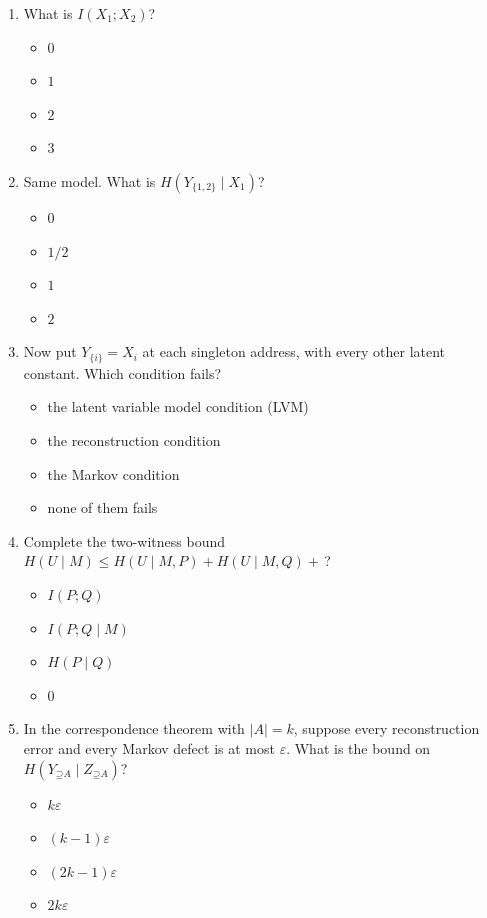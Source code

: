 \documentclass[11pt]{article}
\newcommand{\Up}{\mathord{\supseteq}}
\begin{document}
\begin{enumerate}
\item What is $I(X_1;X_2)$?
\begin{itemize}
\item $0$
\item $1$
\item $2$
\item $3$
\end{itemize}

\item Same model. What is $H(Y_{\{1,2\}}\mid X_1)$?
\begin{itemize}
\item $0$
\item $1/2$
\item $1$
\item $2$
\end{itemize}

\item Now put $Y_{\{i\}}=X_i$ at each singleton address, with every other latent
constant. Which condition fails?
\begin{itemize}
\item the latent variable model condition (LVM)
\item the reconstruction condition
\item the Markov condition
\item none of them fails
\end{itemize}

\item Complete the two-witness bound
$H(U\mid M)\le H(U\mid M,P)+H(U\mid M,Q)+{}$\,?
\begin{itemize}
\item $I(P;Q)$
\item $I(P;Q\mid M)$
\item $H(P\mid Q)$
\item $0$
\end{itemize}

\item In the correspondence theorem with $|A|=k$, suppose every reconstruction
error and every Markov defect is at most $\varepsilon$. What is the bound on
$H(Y_{\Up A}\mid Z_{\Up A})$?
\begin{itemize}
\item $k\varepsilon$
\item $(k-1)\varepsilon$
\item $(2k-1)\varepsilon$
\item $2k\varepsilon$
\end{itemize}


\end{enumerate}
\end{document}
